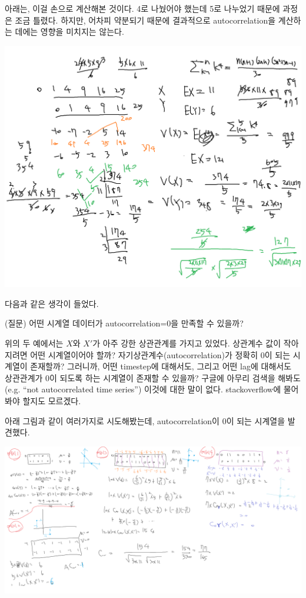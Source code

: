 \documentclass{article}
\begin{document}
아래는, 이걸 손으로 계산해본 것이다.
4로 나눴어야 했는데 5로 나누었기 때문에 과정은 조금 틀렸다.
하지만, 어차피 약분되기 때문에 결과적으로 autocorrelation을 계산하는 데에는 영향을 미치지는 않는다.

\begin{center}
\includegraphics[width=.6\textwidth]{autocorrelation-1}
\end{center}

다음과 같은 생각이 들었다.

\begin{mdframed}
(질문) 어떤 시계열 데이터가 autocorrelation=0을 만족할 수 있을까?
\end{mdframed}

위의 두 예에서는 $X$와 $X'$가 아주 강한 상관관계를 가지고 있었다.
상관계수 값이 작아지려면 어떤 시계열이어야 할까?
자기상관계수(autocorrelation)가 정확히 0이 되는 시계열이 존재할까?
그러니까, 어떤 timestep에 대해서도, 그리고 어떤 lag에 대해서도 상관관계가 0이 되도록 하는 시계열이 존재할 수 있을까?
구글에 아무리 검색을 해봐도 (e.g. ``not autocorrelated time series'') 이것에 대한 말이 없다.
stackoverflow에 물어봐야 할지도 모르겠다.

아래 그림과 같이 여러가지로 시도해봤는데, autocorrelation이 0이 되는 시계열을 발견했다.

\begin{center}
\includegraphics[width=\textwidth]{autocorrelation-2}
\end{center}
\end{document}
